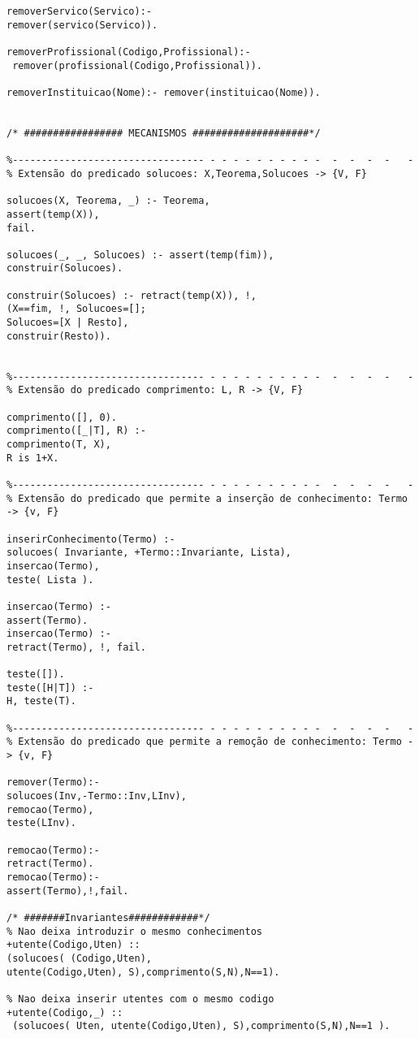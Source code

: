 \documentclass[pdftex,12pt,a4paper]{report}
\begin{document}
\begin{appendices}
\begin{Verbatim}
removerServico(Servico):- 
remover(servico(Servico)).

removerProfissional(Codigo,Profissional):-
 remover(profissional(Codigo,Profissional)).

removerInstituicao(Nome):- remover(instituicao(Nome)).


/* ################# MECANISMOS ####################*/

%--------------------------------- - - - - - - - - - -  -  -  -  -   -
% Extensão do predicado solucoes: X,Teorema,Solucoes -> {V, F}

solucoes(X, Teorema, _) :- Teorema, 
assert(temp(X)), 
fail. 

solucoes(_, _, Solucoes) :- assert(temp(fim)), 
construir(Solucoes).

construir(Solucoes) :- retract(temp(X)), !,
(X==fim, !, Solucoes=[];
Solucoes=[X | Resto], 
construir(Resto)).


%--------------------------------- - - - - - - - - - -  -  -  -  -   -
% Extensão do predicado comprimento: L, R -> {V, F}

comprimento([], 0).
comprimento([_|T], R) :-
comprimento(T, X),
R is 1+X.

%--------------------------------- - - - - - - - - - -  -  -  -  -   -
% Extensão do predicado que permite a inserção de conhecimento: Termo -> {v, F}

inserirConhecimento(Termo) :-
solucoes( Invariante, +Termo::Invariante, Lista),
insercao(Termo),
teste( Lista ).

insercao(Termo) :-
assert(Termo).
insercao(Termo)	:-
retract(Termo), !, fail.

teste([]).
teste([H|T]) :-
H, teste(T).	

%--------------------------------- - - - - - - - - - -  -  -  -  -   -
% Extensão do predicado que permite a remoção de conhecimento: Termo -> {v, F}

remover(Termo):-
solucoes(Inv,-Termo::Inv,LInv),
remocao(Termo),
teste(LInv).

remocao(Termo):-
retract(Termo).
remocao(Termo):-
assert(Termo),!,fail.

/* #######Invariantes############*/
% Nao deixa introduzir o mesmo conhecimentos
+utente(Codigo,Uten) :: 
(solucoes( (Codigo,Uten), 
utente(Codigo,Uten), S),comprimento(S,N),N==1).

% Nao deixa inserir utentes com o mesmo codigo
+utente(Codigo,_) ::
 (solucoes( Uten, utente(Codigo,Uten), S),comprimento(S,N),N==1 ).


\end{Verbatim}
\end{appendices}
\end{document}
